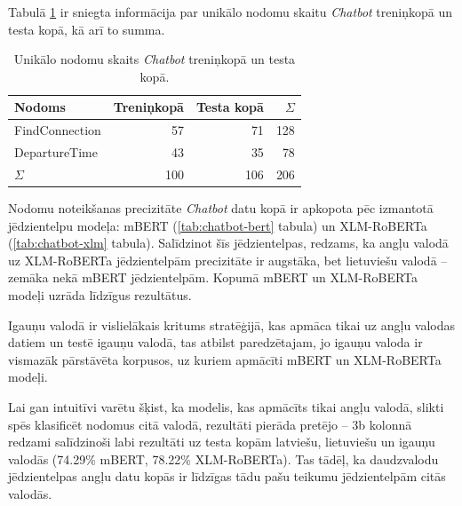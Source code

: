 Tabulā \ref{tab:chatbot-labels} ir sniegta informācija par unikālo nodomu skaitu  \textit{Chatbot} treniņkopā un testa kopā, kā arī to summa.

\begin{table}[htbp]
  \centering
  \caption{Unikālo nodomu skaits \textit{Chatbot} treniņkopā un testa kopā.}
    \begin{tabular}{lrrr} \toprule
    Nodoms & Treniņkopā & Testa kopā & $\Sigma$ \\\midrule
    FindConnection & 57    & 71 & 128 \\
    DepartureTime & 43    & 35 & 78 \\
    $\Sigma$ & 100    & 106 & 206 \\\bottomrule
    \end{tabular}%
  \label{tab:chatbot-labels}%
\end{table}%


Nodomu noteikšanas precizitāte \textit{Chatbot} datu kopā ir apkopota pēc izmantotā jēdzientelpu modeļa: mBERT (\ref{tab:chatbot-bert} tabula) un XLM-RoBERTa (\ref{tab:chatbot-xlm} tabula). Salīdzinot šīs jēdzientelpas, redzams, ka angļu valodā uz XLM-RoBERTa jēdzientelpām precizitāte ir augstāka, bet lietuviešu valodā -- zemāka nekā mBERT jēdzientelpām. Kopumā mBERT un XLM-RoBERTa modeļi uzrāda līdzīgus rezultātus.


Igauņu valodā ir vislielākais kritums stratēģijā, kas apmāca tikai uz angļu valodas datiem un testē igauņu valodā, tas atbilst paredzētajam, jo igauņu valoda ir vismazāk pārstāvēta korpusos, uz kuriem apmācīti mBERT un XLM-RoBERTa modeļi.

Lai gan intuitīvi varētu šķist, ka modelis, kas apmācīts tikai angļu valodā, slikti spēs klasificēt nodomus citā valodā, rezultāti pierāda pretējo -- 3b kolonnā redzami salīdzinoši labi rezultāti uz testa kopām latviešu, lietuviešu un igauņu valodās (74.29\% mBERT, 78.22\% XLM-RoBERTa). Tas tādēļ, ka daudzvalodu jēdzientelpas angļu datu kopās ir līdzīgas tādu pašu teikumu jēdzientelpām citās valodās. 


